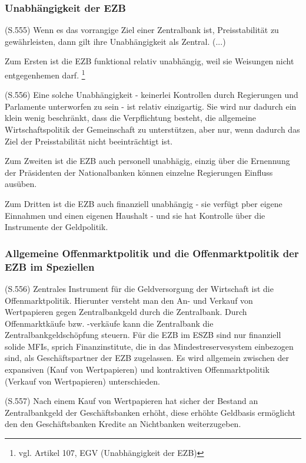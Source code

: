 \documentclass[
      onecolumn,
      a4paper,
      abstracton,
      parskip=half
      ,final
      ]{scrartcl}
\begin{document}
\subsubsection{Unabhängigkeit der EZB}
(S.555)
Wenn es das vorrangige Ziel einer Zentralbank ist, Preisstabilität zu gewährleisten, dann gilt ihre Unabhängigkeit als Zentral. (...)

Zum Ersten ist die EZB funktional relativ unabhängig, weil sie Weisungen nicht entgegenhemen darf. \footnote[34]{vgl. Artikel 107, EGV (Unabhängigkeit der EZB)}

(S.556)
Eine solche Unabhängigkeit - keinerlei Kontrollen durch Regierungen und Parlamente unterworfen zu sein -  ist relativ einzigartig. Sie wird nur dadurch ein klein wenig beschränkt, dass die Verpflichtung besteht, die allgemeine Wirtschaftspolitik der Gemeinschaft zu unterstützen, aber nur, wenn dadurch das Ziel der Preisstabilität nicht beeinträchtigt ist.

Zum Zweiten ist die EZB auch personell unabhägig, einzig über die Ernennung der Präsidenten der Nationalbanken können einzelne Regierungen Einfluss ausüben.

Zum Dritten ist die EZB auch finanziell unabhängig - sie verfügt pber eigene Einnahmen und einen eigenen Haushalt - und sie hat Kontrolle über die Instrumente der Geldpolitik.

\subsubsection{Allgemeine Offenmarktpolitik und die Offenmarktpolitik der EZB im Speziellen}

(S.556)
Zentrales Instrument für die Geldversorgung der Wirtschaft ist die Offenmarktpolitik. Hierunter versteht man den An- und Verkauf von Wertpapieren gegen Zentralbankgeld durch die Zentralbank.
Durch Offenmarktkäufe bzw. -verkäufe kann die Zentralbank die Zentralbankgeldschöpfung steuern. Für die EZB im ESZB sind nur finanziell solide MFIs, sprich Finanzinstitute, die in das Mindestreservesystem einbezogen sind, als Geschäftspartner der EZB zugelassen.
Es wird allgemein zwischen der expansiven (Kauf von Wertpapieren) und kontraktiven Offenmarktpolitik (Verkauf von Wertpapieren) unterschieden.

(S.557)
Nach einem Kauf von Wertpapieren hat sicher der Bestand an Zentralbankgeld der Geschäftsbanken erhöht, diese erhöhte Geldbasis ermöglicht den den Geschäftsbanken Kredite an Nichtbanken weiterzugeben.
\end{document}
